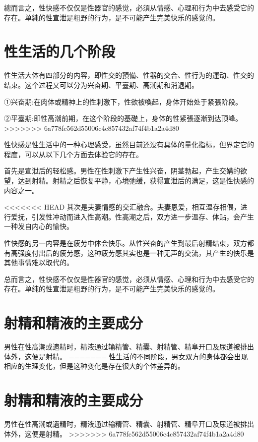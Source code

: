 \documentclass[12pt,UTF8]{ctexbook}
\begin{document}
總而言之，性快感不仅仅是性器官的感觉，必須从情感、心理和行为中去感受它的存在。单純的性宣泄是粗野的行为，是不可能产生完美快乐的感觉的。

\section{性生活的几个阶段}

性生活大体有四部分的内容，即性交的預備、性器的交合、性行为的運动、性交的结束。这个过程又可以分为兴奋期、平臺期、高潮期和消退期。

①兴奋期:在肉体或精神上的性刺激下，性欲被喚起，身体开始处于紧張阶段。

②平臺期:即性高潮前期，在这个阶段的基礎上，身体的性紧張逐漸到达顶峰。
>>>>>>> 6a778fc562d55006c4c857432af74f4b1a2a4d80

性快感是性生活中的一种心理感受，虽然目前还没有具体的量化指标，但界定它的程度，可以从以下几个方面去体验它的存在。

首先是宣泄后的轻松感。男性在性刺激下产生性兴奋，阴茎勃起，产生交媾的欲望，达到射精。射精之后恢复平静，心境弛缓，获得宣泄后的满足，这是性快感的内容之一。

<<<<<<< HEAD
其次是夫妻情感的交汇融合。夫妻恩爱，相互温存相偎，进行爱抚，引发性冲动而进入性高潮。性高潮之后，双方进一步温存、体贴，会产生一种发自内心的愉快。

性快感的另一内容是在疲劳中体会快乐。从性兴奋的产生到最后射精结束，双方都有高强度付出后的疲劳感，这种疲劳感其实也是一种无声的交流，其产生的快乐是其他事情难以取代的。

总而言之，性快感不仅仅是性器官的感觉，必须从情感、心理和行为中去感受它的存在。单纯的性宣泄是粗野的行为，是不可能产生完美快乐的感觉的。

\section{射精和精液的主要成分}

男性在性高潮或遗精时，精液通过输精管、精囊、射精管、精阜开口及尿道被排出体外，这便是射精。
=======
性生活的不同阶段，男女双方的身体都会出现相应的生理变化，但是这种变化是存在很大的个体差异的。

\section{射精和精液的主要成分}

男性在性高潮或遺精时，精液通过输精管、精囊、射精管、精阜开口及尿道被排出体外，这便是射精。
>>>>>>> 6a778fc562d55006c4c857432af74f4b1a2a4d80
\end{document}
